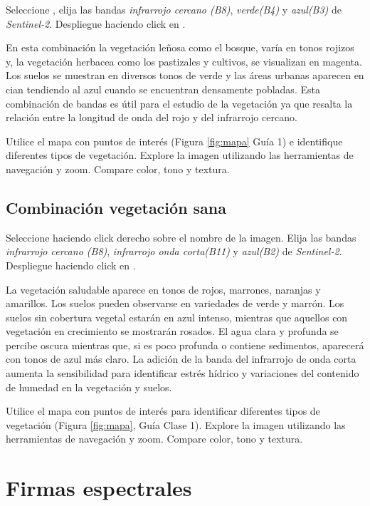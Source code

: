 Seleccione , elija las bandas \emph{infrarrojo cercano (B8)}, \emph{verde(B4)} y \emph{azul(B3)} de \emph{Sentinel-2}. Despliegue haciendo click en .

En esta combinación la vegetación leñosa como el bosque, varía en tonos rojizos y, la vegetación herbacea como los pastizales y cultivos, se visualizan en magenta. Los suelos se muestran en diversos tonos de verde y las áreas urbanas aparecen en cian tendiendo al azul cuando se encuentran densamente pobladas.
Esta combinación de bandas es útil para el estudio de la vegetación ya que resalta la relación entre la longitud de onda del rojo y del infrarrojo cercano.

Utilice el mapa con puntos de interés (Figura \ref{fig:mapa} Guía 1) e identifique diferentes tipos de vegetación. Explore la imagen utilizando las herramientas de navegación y zoom. Compare color, tono y textura.

\subsection{Combinación vegetación sana}
\label{sec:vegetacionsana}

Seleccione  haciendo click derecho sobre el nombre de la imagen. Elija las bandas \emph{infrarrojo cercano (B8)}, \emph{infrarrojo onda corta(B11)} y \emph{azul(B2)} de \emph{Sentinel-2}. Despliegue haciendo click en .

La vegetación saludable aparece en tonos de rojos, marrones, naranjas y amarillos. Los suelos pueden observarse en variedades de verde y marrón. Los suelos sin cobertura vegetal estarán en azul intenso, mientras que aquellos con vegetación en crecimiento se mostrarán rosados. El agua clara y profunda se percibe oscura mientras que, si es poco profunda o contiene sedimentos, aparecerá con tonos de azul más claro.
La adición de la banda del infrarrojo de onda corta aumenta la sensibilidad para identificar estrés hídrico y variaciones del contenido de humedad en la vegetación y suelos.

Utilice el mapa con puntos de interés para identificar diferentes tipos de vegetación (Figura \ref{fig:mapa}, Guía Clase 1). Explore la imagen utilizando las herramientas de navegación y zoom. Compare color, tono y textura.

\section{Firmas espectrales}


